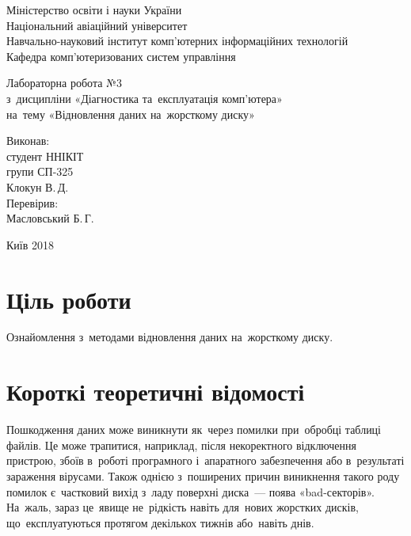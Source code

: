 \documentclass[
	a4paper,
	oneside,
	DIV = 12,
	fontsize = 13pt,
	headings = normal,
]{scrartcl}
\newlength{\gridunitwidth}
\newcommand{\allcaps}[1]{{\addfontfeatures{LetterSpace = 5}#1}}
\begin{document}
\setlength{\gridunitwidth}{\textwidth / 12}
	\begin{titlepage}
		\begin{center}
			Міністерство освіти і науки України\\
			Національний авіаційний університет\\
			Навчально-науковий інститут комп'ютерних інформаційних технологій\\
			Кафедра комп'ютеризованих систем управління

			\vspace{\fill}
				Лабораторна робота №3\\
				з~дисципліни «Діагностика та~експлуатація комп'ютера»\\
				на~тему «Відновлення даних на~жорсткому диску»\\

			\vspace{\fill}

			\begin{flushright}
				Виконав:\\
				студент \allcaps{ННІКІТ}\\
				групи СП-325\\
				Клокун В.\,Д.\\
				Перевірив:\\
				Масловський Б.\,Г.
			\end{flushright}

			Київ 2018
		\end{center}
	\end{titlepage}

	\section{Ціль роботи}
		Ознайомлення з~методами відновлення даних на~жорсткому диску.

	\section{Короткі теоретичні відомості}
		Пошкодження даних може виникнути як~через помилки при~обробці таблиці файлів. Це може трапитися, наприклад, після некоректного відключення пристрою, збоїв в~роботі програмного і~апаратного забезпечення або в~результаті зараження вірусами. Також однією з~поширених причин виникнення такого роду помилок є~частковий вихід з~ладу поверхні диска~— поява «bad-секторів». На~жаль, зараз це~явище не~рідкість навіть для~нових жорстких дисків, що~експлуатуються протягом декількох тижнів або~навіть днів. 
\end{document}
